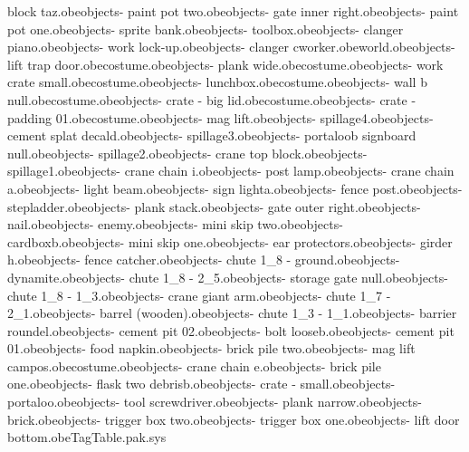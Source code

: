 block taz.obe objects\bank - paint pot two.obe objects\bank - gate inner right.obe objects\bank - paint pot one.obe objects\bank - sprite bank.obe objects\bank - toolbox.obe objects\bank - clanger piano.obe objects\bank - work lock-up.obe objects\bank - clanger cworker.obe world.obe objects\bank - lift trap door.obe costume\swattaz.obe objects\bank - plank wide.obe costume\swatbelt.obe objects\bank - work crate small.obe costume\swatcap.obe objects\bank - lunchbox.obe costume\swatelbowpadl.obe objects\bank - wall b null.obe costume\swatelbowpadr.obe objects\bank - crate - big lid.obe costume\swatshades.obe objects\bank - crate - padding 01.obe costume\swatbackpack.obe objects\bank - mag lift.obe objects\bank - spillage4.obe objects\bank - cement splat decald.obe objects\bank - spillage3.obe objects\bank - portaloob signboard null.obe objects\bank - spillage2.obe objects\bank - crane top block.obe objects\bank - spillage1.obe objects\bank - crane chain i.obe objects\bank - post lamp.obe objects\bank - crane chain a.obe objects\bank - light beam.obe objects\bank - sign lighta.obe objects\bank - fence post.obe objects\bank - stepladder.obe objects\bank - plank stack.obe objects\bank - gate outer right.obe objects\bank - nail.obe objects\bank - enemy.obe objects\bank - mini skip two.obe objects\bank - cardboxb.obe objects\bank - mini skip one.obe objects\bank - ear protectors.obe objects\bank - girder h.obe objects\bank - fence catcher.obe objects\bank - chute 1_8 - ground.obe objects\bank - dynamite.obe objects\bank - chute 1_8 - 2_5.obe objects\bank - storage gate null.obe objects\bank - chute 1_8 - 1_3.obe objects\bank - crane giant arm.obe objects\bank - chute 1_7 - 2_1.obe objects\bank - barrel (wooden).obe objects\bank - chute 1_3 - 1_1.obe objects\bank - barrier roundel.obe objects\bank - cement pit 02.obe objects\bank - bolt looseb.obe objects\bank - cement pit 01.obe objects\bank - food napkin.obe objects\bank - brick pile two.obe objects\bank - mag lift campos.obe costume\swatcheesegun.obe objects\bank - crane chain e.obe objects\bank - brick pile one.obe objects\bank - flask two debrisb.obe objects\bank - crate - small.obe objects\bank - portaloo.obe objects\bank - tool screwdriver.obe objects\bank - plank narrow.obe objects\bank - brick.obe objects\bank - trigger box two.obe objects\bank - trigger box one.obe objects\bank - lift door bottom.obe TagTable.pak.sys 